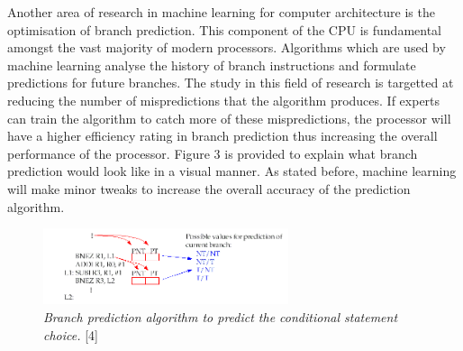 \documentclass[conference]{IEEEtran}
\begin{document}
Another area of research in machine learning for computer architecture is the optimisation of branch prediction. This component of the CPU is fundamental amongst 
the vast majority of modern processors. Algorithms which are used by machine learning analyse the history of branch instructions and formulate predictions for future branches. 
The study in this field of research is targetted at reducing the number of mispredictions that the algorithm produces. If experts can train the algorithm to catch more of these 
mispredictions, the processor will have a higher efficiency rating in branch prediction thus increasing the overall performance of the processor.
Figure 3 is provided to explain what branch prediction would look like in a visual manner. As stated before, machine learning will make minor tweaks to increase the overall accuracy 
of the prediction algorithm.
\begin{figure}[H]
    \centering
    \includegraphics[width=7.2cm]{imgs/branch-prediction.png}
    \caption{\textit{Branch prediction algorithm to predict the conditional statement choice.} [4]}
    \label{fig3:picture}
\end{figure}
\end{document}
